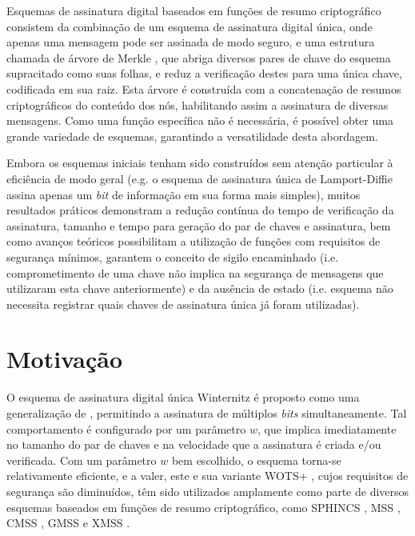 \documentclass[12pt]{article}
\begin{document}
Esquemas de assinatura digital baseados em funções de resumo criptográfico
consistem da combinação de um esquema de assinatura digital única, onde apenas
uma mensagem pode ser assinada de modo seguro, e uma estrutura chamada de
árvore de Merkle \cite{Merkle:1989:CDS:118209.118230}, que abriga diversos
pares de chave do esquema supracitado como suas folhas, e reduz a verificação
destes para uma única chave, codificada em sua raiz. Esta árvore é construída
com a concatenação de resumos criptográficos do conteúdo dos nós, habilitando
assim a assinatura de diversas mensagens. Como uma função específica não é
necessária, é possível obter uma grande variedade de esquemas, garantindo a
versatilidade desta abordagem.

Embora os esquemas iniciais tenham sido construídos sem atenção particular à
eficiência de modo geral (e.g. o esquema de assinatura única de Lamport-Diffie
\cite{Lamport1979} assina apenas um \emph{bit} de informação em sua forma mais
simples), muitos resultados práticos demonstram a redução contínua do tempo de
verificação da assinatura, tamanho e tempo para geração do par de chaves e
assinatura, bem como avanços teóricos possibilitam a utilização de funções com
requisitos de segurança mínimos, garantem o conceito de sigilo encaminhado
\cite{Buchmann:2011:XPF:2184003.2184011} (i.e. comprometimento de uma chave não
implica na segurança de mensagens que utilizaram esta chave anteriormente) e da
ausência de estado \cite{Bernstein2015} (i.e. esquema não necessita registrar
quais chaves de assinatura única já foram utilizadas).

\section{Motivação}

O esquema de assinatura digital única Winternitz é proposto como uma
generalização de \cite{Lamport1979}, permitindo a assinatura de múltiplos
\emph{bits} simultaneamente. Tal comportamento é configurado por um parâmetro
$w$, que implica imediatamente no tamanho do par de chaves e na velocidade que
a assinatura é criada e/ou verificada. Com um parâmetro $w$ bem escolhido, o
esquema torna-se relativamente eficiente, e a valer, este e sua variante WOTS+
\cite{cryptoeprint:2017:965}, cujos requisitos de segurança são diminuídos, têm
sido utilizados amplamente como parte de diversos esquemas baseados em funções
de resumo criptográfico, como SPHINCS \cite{Bernstein2015}, MSS
\cite{Merkle:1989:CDS:118209.118230}, CMSS \cite{Buchmann2006}, GMSS
\cite{Buchmann2007} e XMSS \cite{Buchmann:2011:XPF:2184003.2184011}.
\end{document}
